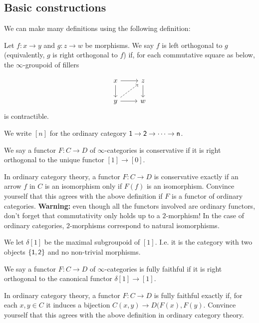 \subsection{Basic constructions}
We can make many definitions using the following definition:
\begin{definition}
    Let $f:x\rightarrow y$ and $g:z\rightarrow w$ be morphisms. We say $f$ is left orthogonal to $g$ (equivalently, $g$ is right orthogonal to $f$) if, for each commutative square as below, the $\infty$-groupoid of fillers

\[\begin{tikzcd}
	x & z \\
	y & w
	\arrow[from=1-1, to=1-2]
	\arrow[from=1-1, to=2-1]
	\arrow[from=1-2, to=2-2]
	\arrow[dashed, from=2-1, to=1-2]
	\arrow[from=2-1, to=2-2]
\end{tikzcd}\]
is contractible.
    
\end{definition}

We write $[n]$ for the ordinary category $\sf 1\rightarrow 2\rightarrow \dots \rightarrow n$.

\begin{definition}
    We say a functor $F:C\rightarrow D$ of $\infty$-categories is conservative if it is right orthogonal to the unique functor $[1]\rightarrow [0]$.
\end{definition}

In ordinary category theory, a functor $F:C\rightarrow D$ is conservative exactly if an arrow $f$ in $C$ is an isomorphism only if $F(f)$ is an isomorphism. Convince yourself that this agrees with the above definition if $F$ is a functor of ordinary categories. \textbf{Warning:} even though all the functors involved are ordinary functors, don't forget that commutativity only holds up to a $2$-morphism! In the case of ordinary categories, $2$-morphisms correspond to natural isomorphisms.

We let $\delta[1]$ be the maximal subgroupoid of $[1]$. I.e. it is the category with two objects $\sf \{1,2\}$ and no non-trivial morphisms.


\begin{definition}
    We say a functor $F:C\rightarrow D$ of $\infty$-categories is fully faithful if it is right orthogonal to the canonical functor $\delta[1] \rightarrow [1]$.
\end{definition}

In ordinary category theory, a functor $F:C\rightarrow D$ is fully faithful exactly if, for each $x,y\in C$ it induces a bijection $C(x,y)\rightarrow D(F(x),F(y)$. Convince yourself that this agrees with the above definition in ordinary category theory.

